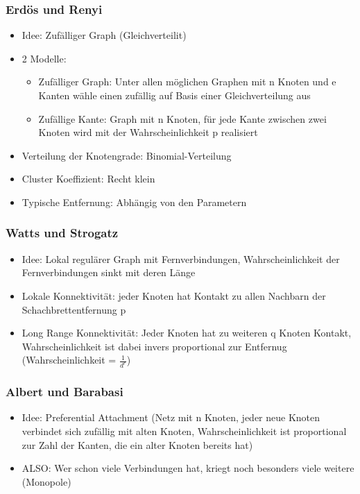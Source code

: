 \documentclass{article} %
\begin{document}
	\subsubsection{Erdös und Renyi}
	\begin{itemize}
		\item Idee: Zufälliger Graph (Gleichverteilit)
		\item 2 Modelle:
		\begin{itemize}
			\item Zufälliger Graph: Unter allen möglichen Graphen mit n Knoten und e Kanten wähle einen zufällig auf Basis einer Gleichverteilung aus
			\item Zufällige Kante: Graph mit n Knoten, für jede Kante zwischen zwei Knoten wird mit der Wahrscheinlichkeit p realisiert
		\end{itemize}
		\item Verteilung der Knotengrade: Binomial-Verteilung
		\item Cluster Koeffizient: Recht klein
		\item Typische Entfernung: Abhängig von den Parametern
	\end{itemize}
	\subsubsection{Watts und Strogatz}
	\begin{itemize}
		\item Idee: Lokal regulärer Graph mit Fernverbindungen, Wahrscheinlichkeit der Fernverbindungen sinkt mit deren Länge 
		\item Lokale Konnektivität: jeder Knoten hat Kontakt zu allen Nachbarn der Schachbrettentfernung p
		\item Long Range Konnektivität: Jeder Knoten hat zu weiteren q Knoten Kontakt, Wahrscheinlichkeit ist dabei invers proportional zur Entfernug (Wahrscheinlichkeit = $\frac{1}{d^{r}}$)
	\end{itemize}
	\subsubsection{Albert und Barabasi}
	\begin{itemize}
		\item Idee: Preferential Attachment (Netz mit n Knoten, jeder neue Knoten verbindet sich zufällig mit alten Knoten, Wahrscheinlichkeit ist proportional zur Zahl der Kanten, die ein alter Knoten bereits hat)
		\item ALSO: Wer schon viele Verbindungen hat, kriegt noch besonders viele weitere (Monopole)
	\end{itemize}
\end{document}
